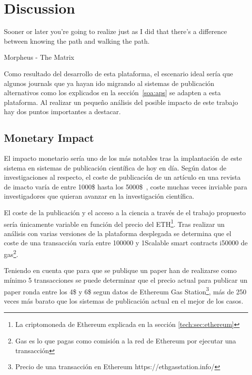 \chapter{Discussion}

\begin{FraseCelebre}
  \begin{Frase}
    Sooner or later you're going to realize just as I did that there's a
    difference between knowing the path and walking the path.
  \end{Frase}
  \begin{Fuente}
    Morpheus - The Matrix
  \end{Fuente}
\end{FraseCelebre}



Como resultado del desarrollo de esta plataforma, el escenario ideal sería que
algunos journals que ya hayan ido migrando al sistemas de publicación
alternativos como los explicados en la sección~\ref{soa:aps} se adapten a esta
plataforma. Al realizar un pequeño análisis del posible impacto de este trabajo
hay dos puntos importantes a destacar.

\section{Monetary Impact}
El impacto monetario sería uno de los más notables tras la implantación de este
sistema en sistemas de publicación científica de hoy en día. Según datos de
investigaciones al respecto, el coste de publicación de un artículo en una
revista de imacto varía de entre 1000\$ hasta los
5000\$~\cite{van2013true,russel2008business}, coste muchas veces inviable para
investigadores que quieran avanzar en la investigación científica.

El coste de la publicación y el acceso a la ciencia a través de el trabajo
propuesto sería únicamente variable en función del precio del ETH\footnote{La
  criptomoneda de Ethereum explicada en la sección \ref{tech:sec:ethereum}}.
Tras realizar un análisis con varias versiones de la plataforma desplegada se
determina que el coste de una transacción varía entre 100000 y 1Scalable smart contracts i50000 de
gas\footnote{Gas es lo que pagas como comisión a la red de Ethereum por ejecutar
  una transacción}.

Teniendo en cuenta que para que se publique un paper han de realizarse como
mínimo 5 transacciones se puede determinar que el precio actual para publicar un
paper ronda entre los 4\$ y 6\$ segun datos de Ethereum Gas
Station\footnote{Precio de una transacción en Ethereum
  https://ethgasstation.info/}, más de 250 veces más barato que los sistemas de
publicación actual en el mejor de los casos.

